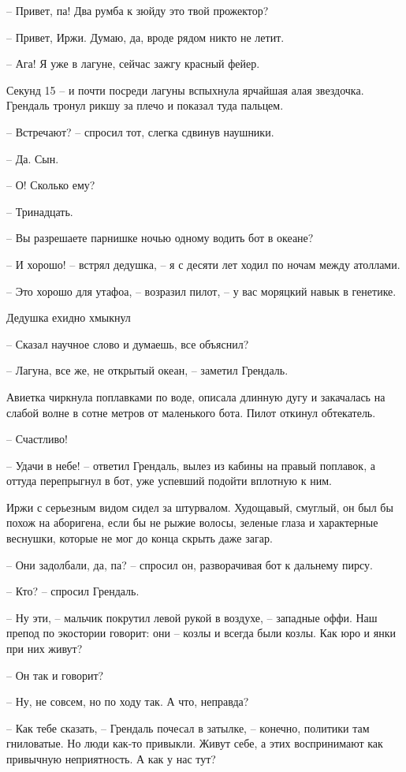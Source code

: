 -- Привет, па! Два румба к зюйду это твой прожектор?

-- Привет, Иржи. Думаю, да, вроде рядом никто не летит.

-- Ага! Я уже в лагуне, сейчас зажгу красный фейер.

Секунд 15 -- и почти посреди лагуны вспыхнула ярчайшая алая звездочка. Грендаль тронул рикшу за плечо и показал туда пальцем.

-- Встречают? -- спросил тот, слегка сдвинув наушники.

-- Да. Сын.

-- О! Сколько ему?

-- Тринадцать.

-- Вы разрешаете парнишке ночью одному водить бот в океане?

-- И хорошо! -- встрял дедушка, -- я с десяти лет ходил по ночам между атоллами.

-- Это хорошо для утафоа, -- возразил пилот, -- у вас моряцкий навык в генетике.

Дедушка ехидно хмыкнул

-- Сказал научное слово и думаешь, все объяснил?

-- Лагуна, все же, не открытый океан, -- заметил Грендаль.

Авиетка чиркнула поплавками по воде, описала длинную дугу и закачалась на слабой волне в сотне метров от маленького бота. Пилот откинул обтекатель.

-- Счастливо!

-- Удачи в небе! -- ответил Грендаль, вылез из кабины на правый поплавок, а оттуда перепрыгнул в бот, уже успевший подойти вплотную к ним.

Иржи с серьезным видом сидел за штурвалом. Худощавый, смуглый, он был бы похож на аборигена, если бы не рыжие волосы, зеленые глаза и характерные веснушки, которые не мог до конца скрыть даже загар.

-- Они задолбали, да, па? -- спросил он, разворачивая бот к дальнему пирсу.

-- Кто? -- спросил Грендаль.

-- Ну эти, -- мальчик покрутил левой рукой в воздухе, -- западные оффи. Наш препод по экостории говорит: они -- козлы и всегда были козлы. Как юро и янки при них живут?

-- Он так и говорит?

-- Ну, не совсем, но по ходу так. А что, неправда?

-- Как тебе сказать, -- Грендаль почесал в затылке, -- конечно, политики там гниловатые. Но люди как-то привыкли. Живут себе, а этих воспринимают как привычную неприятность. А как у нас тут?

